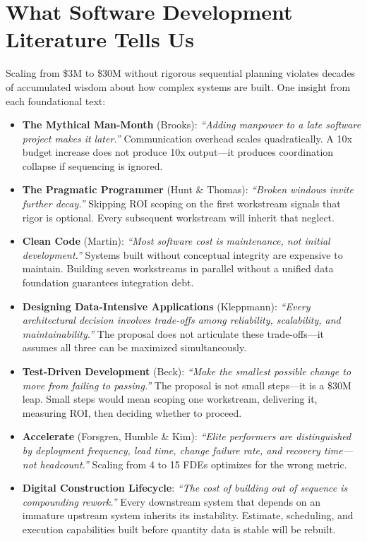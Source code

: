 \documentclass[11pt, letterpaper]{article}
\begin{document}
\vspace{1em}

\section*{What Software Development Literature Tells Us}

Scaling from \$3M to \$30M without rigorous sequential planning violates decades of accumulated wisdom about how complex systems are built. One insight from each foundational text:

\begin{itemize}
    \item \textbf{The Mythical Man-Month} (Brooks): \textit{``Adding manpower to a late software project makes it later.''} Communication overhead scales quadratically. A 10x budget increase does not produce 10x output---it produces coordination collapse if sequencing is ignored.
    
    \item \textbf{The Pragmatic Programmer} (Hunt \& Thomas): \textit{``Broken windows invite further decay.''} Skipping ROI scoping on the first workstream signals that rigor is optional. Every subsequent workstream will inherit that neglect.
    
    \item \textbf{Clean Code} (Martin): \textit{``Most software cost is maintenance, not initial development.''} Systems built without conceptual integrity are expensive to maintain. Building seven workstreams in parallel without a unified data foundation guarantees integration debt.
    
    \item \textbf{Designing Data-Intensive Applications} (Kleppmann): \textit{``Every architectural decision involves trade-offs among reliability, scalability, and maintainability.''} The proposal does not articulate these trade-offs---it assumes all three can be maximized simultaneously.
    
    \item \textbf{Test-Driven Development} (Beck): \textit{``Make the smallest possible change to move from failing to passing.''} The proposal is not small steps---it is a \$30M leap. Small steps would mean scoping one workstream, delivering it, measuring ROI, then deciding whether to proceed.
    
    \item \textbf{Accelerate} (Forsgren, Humble \& Kim): \textit{``Elite performers are distinguished by deployment frequency, lead time, change failure rate, and recovery time---not headcount.''} Scaling from 4 to 15 FDEs optimizes for the wrong metric.
    
    \item \textbf{Digital Construction Lifecycle}: \textit{``The cost of building out of sequence is compounding rework.''} Every downstream system that depends on an immature upstream system inherits its instability. Estimate, scheduling, and execution capabilities built before quantity data is stable will be rebuilt.
\end{itemize}
\end{document}
